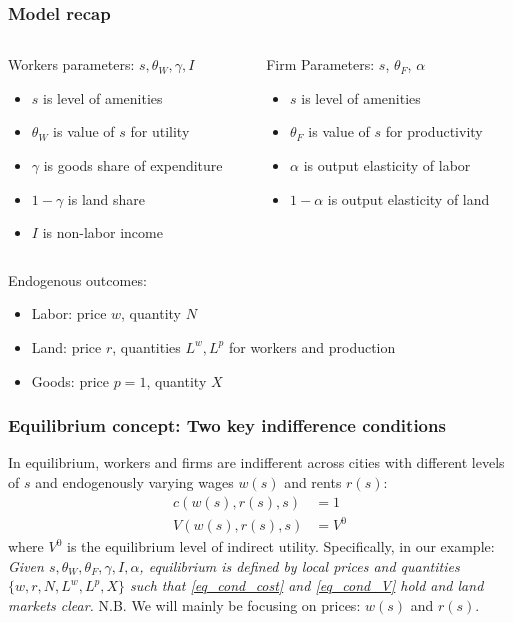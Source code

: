 \documentclass[11pt,notes=hide,aspectratio=169]{beamer}
\begin{document}
\begin{frame}
\frametitle{Model recap}
\begin{columns}
\begin{column}{0.49\textwidth}
Workers parameters: $s,\theta_W, \gamma, I$
\begin{itemize}
\item $s$ is level of amenities
\item $\theta_W$ is value of $s$ for utility
\item $\gamma$ is goods share of expenditure
\item $1-\gamma$ is land share
\item $I$ is non-labor income
\end{itemize}
\end{column}
\begin{column}{0.49\textwidth}
Firm Parameters: $s$, ${\theta_F}$, $\alpha$ 
\begin{itemize}
\item $s$ is level of amenities
\item $\theta_F$ is value of $s$ for productivity
\item $\alpha$ is output elasticity of labor
\item $1-\alpha$ is output elasticity of land
\end{itemize}
\vfill
\end{column}
\end{columns}
\begin{center}
Endogenous outcomes:
\begin{itemize}
\item Labor: price $w$, quantity $N$
\item Land: price $r$, quantities $L^w, L^p$ for workers and production
\item Goods: price $p=1$, quantity $X$ 
\end{itemize}
\end{center}
\end{frame}
\begin{frame}
\frametitle{Equilibrium concept: Two key indifference conditions}
 In equilibrium, workers and firms are indifferent across cities with different levels of $s$ and endogenously varying wages $w(s)$ and rents $r(s)$:
\begin{align} 
c(w(s), r(s), s) &= 1 \label{eq_cond_cost} \\
V(w(s), r(s), s) &= V^0 \label{eq_cond_V}
\end{align}
where $V^0$ is the equilibrium level of indirect utility.
\bigskip
Specifically, in our example: \\
\textit{Given $s,\theta_W, \theta_F, \gamma, I, \alpha$, equilibrium is defined by local prices and quantities $\{w,r,N,L^w,L^p,X\}$ such that \eqref{eq_cond_cost} and \eqref{eq_cond_V} hold and land markets clear.}
\bigskip
N.B. We will mainly be focusing on prices: $w(s)$ and $r(s)$.
\end{frame}
\end{document}
